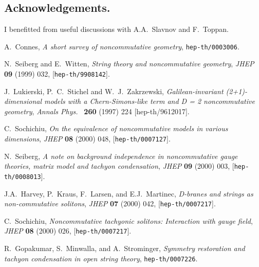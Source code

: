 \documentclass[a4paper]{amsart}
\begin{document}
\subsection*{Acknowledgements.} I benefitted from useful
discussions with A.A.~Slavnov and F.~Toppan.
\providecommand{\href}[2]{#2}\begingroup\raggedright\begin{thebibliography}{1}

A.~Connes, {\it A short survey of noncommutative geometry},
  \href{http://xxx.lanl.gov/abs/hep-th/0003006}{{\tt hep-th/0003006}}.

N.~Seiberg and E.~Witten, {\it String theory and noncommutative geometry},
  {\em JHEP} {\bf 09} (1999) 032,
  [\href{http://xxx.lanl.gov/abs/hep-th/9908142}{{\tt hep-th/9908142}}].

J.~Lukierski, P.~C.~Stichel and W.~J.~Zakrzewski, {\it Galilean-invariant
(2+1)-dimensional models with a Chern-Simons-like  term and D = 2 noncommutative
geometry}, {\em Annals Phys.\ }  {\bf 260} (1997) 224 [hep-th/9612017].

C.~Sochichiu, {\it On the equivalence of noncommutative models in various
  dimensions},  {\em JHEP} {\bf 08} (2000) 048,
  [\href{http://xxx.lanl.gov/abs/hep-th/0007127}{{\tt hep-th/0007127}}].

N.~Seiberg, {\it A note on background independence in noncommutative gauge
  theories, matrix model and tachyon condensation},  {\em JHEP} {\bf 09} (2000)
  003, [\href{http://xxx.lanl.gov/abs/hep-th/0008013}{{\tt hep-th/0008013}}].

J.A.~Harvey, P.~Kraus, F.~Larsen, and E.J.~Martinec, {\it D-branes
and strings as non-commutative solitons},  {\em JHEP} {\bf 07}
(2000) 042,
  [\href{http://xxx.lanl.gov/abs/hep-th/0007217}{{\tt hep-th/0007217}}].

C.~Sochichiu, {\it Noncommutative tachyonic solitons: Interaction
with gauge
  field},  {\em JHEP} {\bf 08} (2000) 026,
  [\href{http://xxx.lanl.gov/abs/hep-th/0007217}{{\tt hep-th/0007217}}].

R.~Gopakumar, S.~Minwalla, and A.~Strominger, {\it Symmetry restoration and
tachyon condensation in open string theory},
  \href{http://xxx.lanl.gov/abs/hep-th/0007226}{{\tt hep-th/0007226}}.

\end{thebibliography}\endgroup
\end{document}
